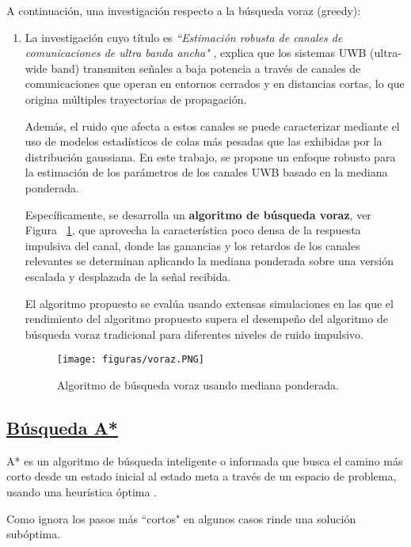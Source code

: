 \documentclass[10pt,conference]{IEEEtran}
\begin{document}
A continuación, una investigación respecto a la búsqueda voraz (greedy):
\begin{enumerate}
\item La investigación cuyo título es \textit{“Estimación robusta de canales de comunicaciones de ultra banda ancha"} \citep{yanez2019estimacion}, explica que los sistemas UWB (ultra-wide band) transmiten señales a baja potencia a través de canales de comunicaciones que operan en entornos cerrados y en distancias cortas, lo que origina múltiples trayectorias de propagación.

Además, el ruido que afecta a estos canales se puede caracterizar mediante el uso de modelos estadísticos de colas más pesadas que las exhibidas por la distribución gaussiana. En este trabajo, se propone un enfoque robusto para la estimación de los parámetros de los canales UWB basado en la mediana ponderada.

Específicamente, se desarrolla un \textbf{algoritmo de búsqueda voraz}, ver Figura ~\ref{fgre}, que aprovecha la característica poco densa de la respuesta impulsiva del canal, donde las ganancias y los retardos de los canales relevantes se determinan aplicando la mediana ponderada sobre una versión escalada y desplazada de la señal recibida.

El algoritmo propuesto se evalúa usando extensas simulaciones en las que el rendimiento del algoritmo propuesto supera el desempeño del algoritmo de búsqueda voraz tradicional para diferentes niveles de ruido impulsivo.

\begin{figure}[H]
 \begin{center}
       \texttt{[image: figuras/voraz.PNG]}
      \caption{Algoritmo de búsqueda voraz usando mediana ponderada.}
      \label{fgre} 
      \end{center}
\end{figure}
\end{enumerate}
\subsection{\underline{\textbf{Búsqueda A*}}}
A* es un algoritmo de búsqueda inteligente o informada que busca el camino más corto desde un estado inicial al estado meta a través de un espacio de problema, usando una heurística óptima \citep{Algoritm99}.

Como ignora los pasos más “cortos" en algunos casos rinde una solución subóptima.
\end{document}
